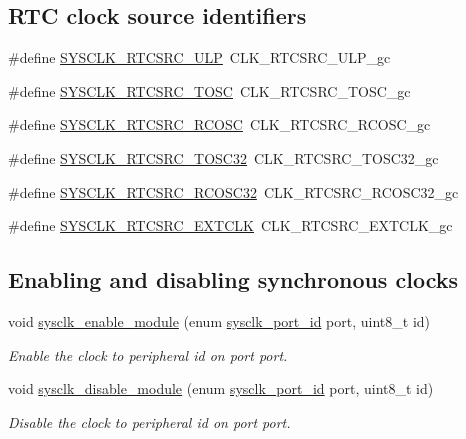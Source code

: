 \subsection*{R\-T\-C clock source identifiers}
\begin{DoxyCompactItemize}
\item 
\#define \hyperlink{group__sysclk__group_gaa6612809ed0cf67daf37c3cdde33a6cc}{S\-Y\-S\-C\-L\-K\-\_\-\-R\-T\-C\-S\-R\-C\-\_\-\-U\-L\-P}~C\-L\-K\-\_\-\-R\-T\-C\-S\-R\-C\-\_\-\-U\-L\-P\-\_\-gc
\item 
\#define \hyperlink{group__sysclk__group_ga6919aaa49928a57d0b1e144326a21c6e}{S\-Y\-S\-C\-L\-K\-\_\-\-R\-T\-C\-S\-R\-C\-\_\-\-T\-O\-S\-C}~C\-L\-K\-\_\-\-R\-T\-C\-S\-R\-C\-\_\-\-T\-O\-S\-C\-\_\-gc
\item 
\#define \hyperlink{group__sysclk__group_ga4ac9e039751211071b79855fa6bcdf9e}{S\-Y\-S\-C\-L\-K\-\_\-\-R\-T\-C\-S\-R\-C\-\_\-\-R\-C\-O\-S\-C}~C\-L\-K\-\_\-\-R\-T\-C\-S\-R\-C\-\_\-\-R\-C\-O\-S\-C\-\_\-gc
\item 
\#define \hyperlink{group__sysclk__group_gae1e1ecfe4830a89d907985d4088cfa50}{S\-Y\-S\-C\-L\-K\-\_\-\-R\-T\-C\-S\-R\-C\-\_\-\-T\-O\-S\-C32}~C\-L\-K\-\_\-\-R\-T\-C\-S\-R\-C\-\_\-\-T\-O\-S\-C32\-\_\-gc
\item 
\#define \hyperlink{group__sysclk__group_ga1043bd50a76488f12dd6013d4f67aef0}{S\-Y\-S\-C\-L\-K\-\_\-\-R\-T\-C\-S\-R\-C\-\_\-\-R\-C\-O\-S\-C32}~C\-L\-K\-\_\-\-R\-T\-C\-S\-R\-C\-\_\-\-R\-C\-O\-S\-C32\-\_\-gc
\item 
\#define \hyperlink{group__sysclk__group_gac1ee90dbb5cd327a97377824865acc9f}{S\-Y\-S\-C\-L\-K\-\_\-\-R\-T\-C\-S\-R\-C\-\_\-\-E\-X\-T\-C\-L\-K}~C\-L\-K\-\_\-\-R\-T\-C\-S\-R\-C\-\_\-\-E\-X\-T\-C\-L\-K\-\_\-gc
\end{DoxyCompactItemize}
\subsection*{Enabling and disabling synchronous clocks}
\begin{DoxyCompactItemize}
\item 
void \hyperlink{group__sysclk__group_gac31edbbb1296f1eb737401b7b2b4e352}{sysclk\-\_\-enable\-\_\-module} (enum \hyperlink{group__sysclk__group_ga8e29b46d7670875f4c509efd7a8d5f1a}{sysclk\-\_\-port\-\_\-id} port, uint8\-\_\-t id)
\begin{DoxyCompactList}\small\item\em Enable the clock to peripheral {\itshape id} on port {\itshape port}. \end{DoxyCompactList}\item 
void \hyperlink{group__sysclk__group_gaa2610ab0fbb9f2d68c7415c7c15b7008}{sysclk\-\_\-disable\-\_\-module} (enum \hyperlink{group__sysclk__group_ga8e29b46d7670875f4c509efd7a8d5f1a}{sysclk\-\_\-port\-\_\-id} port, uint8\-\_\-t id)
\begin{DoxyCompactList}\small\item\em Disable the clock to peripheral {\itshape id} on port {\itshape port}. \end{DoxyCompactList}\end{DoxyCompactItemize}
